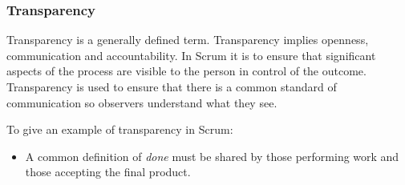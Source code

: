 \subsubsection{Transparency}


Transparency is a generally defined term. Transparency implies openness, communication and
accountability. In Scrum it is to ensure that significant aspects of the process are visible
to the person in control of the outcome\cite{scrumguide11}. Transparency is used to ensure
that there is a common standard of communication so observers understand what they
see\cite{scrumguide11}.

To give an example of transparency in Scrum:


\begin{itemize}
	\item A common definition of \textit{done} must be shared by those performing work and
those accepting the final product\cite{scrumguide11}.
\end{itemize}